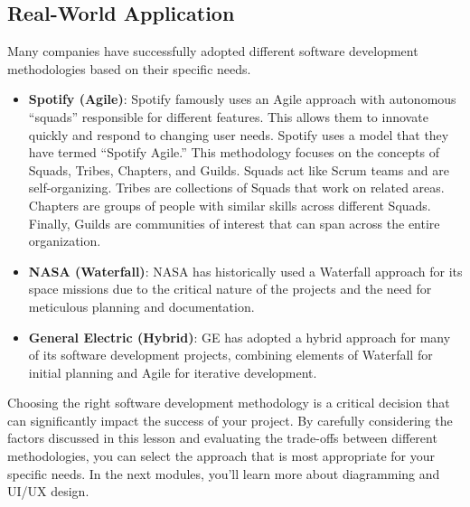 \subsection{Real-World Application}

Many companies have successfully adopted different software development
methodologies based on their specific needs.

\begin{itemize}
  \item \textbf{Spotify (Agile)}: Spotify famously uses an Agile approach with autonomous ``squads'' responsible for different features. This allows them to innovate quickly and respond to changing user needs. Spotify uses a model that they have termed ``Spotify Agile.'' This methodology focuses on the concepts of Squads, Tribes, Chapters, and Guilds. Squads act like Scrum teams and are self-organizing. Tribes are collections of Squads that work on related areas. Chapters are groups of people with similar skills across different Squads. Finally, Guilds are communities of interest that can span across the entire organization.

  \item \textbf{NASA (Waterfall)}: NASA has historically used a Waterfall approach for its space missions due to the critical nature of the projects and the need for meticulous planning and documentation.

  \item \textbf{General Electric (Hybrid)}: GE has adopted a hybrid approach for many of its software development projects, combining elements of Waterfall for initial planning and Agile for iterative development.
\end{itemize}

Choosing the right software development methodology is a critical decision that
can significantly impact the success of your project. By carefully considering
the factors discussed in this lesson and evaluating the trade-offs between
different methodologies, you can select the approach that is most appropriate
for your specific needs. In the next modules, you'll learn more about
diagramming and UI/UX design.